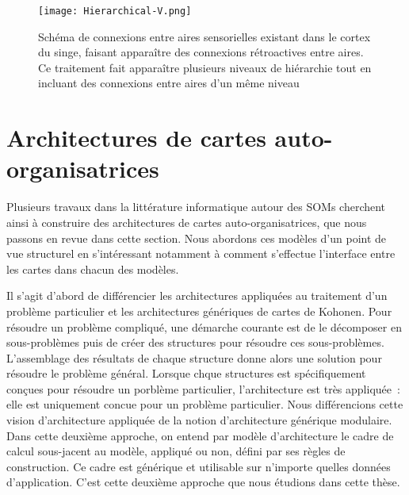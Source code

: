 \documentclass[../main]{subfiles}
\begin{document}
\begin{figure}
    \centering
    \texttt{[image: Hierarchical-V.png]}
    \caption{Schéma de connexions entre aires sensorielles existant dans le cortex du singe, faisant apparaître des connexions rétroactives entre aires. Ce traitement fait apparaître plusieurs niveaux de hiérarchie tout en incluant des connexions entre aires d'un même niveau \cite{primate_cortex_91}\label{fig:primate}}
\end{figure}

\section{Architectures de cartes auto-organisatrices}

Plusieurs travaux dans la littérature informatique autour des SOMs cherchent ainsi à construire des architectures de cartes auto-organisatrices, que nous passons en revue dans cette section.
Nous abordons ces modèles d'un point de vue structurel en s'intéressant notamment à comment s'effectue l'interface entre les cartes dans chacun des modèles.

Il s'agit d'abord de différencier les architectures appliquées au traitement d'un problème particulier et les architectures génériques de cartes de Kohonen.
Pour résoudre un problème compliqué, une démarche courante est de le décomposer en sous-problèmes puis de créer des structures pour résoudre ces sous-problèmes. L'assemblage des résultats de chaque structure donne alors une solution pour résoudre le problème général.
Lorsque chque structures est spécifiquement conçues pour résoudre un porblème particulier, l'architecture est très appliquée~: elle est uniquement concue pour un problème particulier.
Nous différencions cette vision d'architecture appliquée de la notion d'architecture générique modulaire.
Dans cette deuxième approche, on entend par modèle d'architecture le cadre de calcul sous-jacent au modèle, appliqué ou non, défini par ses règles de construction. Ce cadre est générique et utilisable sur n'importe quelles données d'application. 
C'est cette deuxième approche que nous étudions dans cette thèse.
\end{document}

